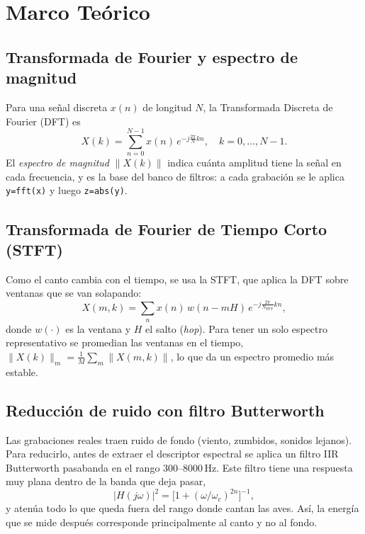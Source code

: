 \documentclass[conference]{IEEEtran}
\begin{document}
\section{Marco Teórico}\label{sec:marco}

\subsection{Transformada de Fourier y espectro de magnitud}
Para una señal discreta $x(n)$ de longitud $N$, la Transformada Discreta de
Fourier (DFT) es
\begin{equation}
X(k)=\sum_{n=0}^{N-1} x(n)\,e^{-j\frac{2\pi}{N}kn}, \quad k=0,\dots,N-1 .
\end{equation}
El \emph{espectro de magnitud} $\lVert X(k)\rVert$ indica cuánta amplitud tiene la
señal en cada frecuencia, y es la base del banco de filtros: a cada grabación se
le aplica \texttt{y=fft(x)} y luego \texttt{z=abs(y)}.

\subsection{Transformada de Fourier de Tiempo Corto (STFT)}
Como el canto cambia con el tiempo, se usa la STFT, que aplica la DFT sobre
ventanas que se van solapando:
\begin{equation}
X(m,k)=\sum_{n} x(n)\,w(n-mH)\,e^{-j\frac{2\pi}{N_{\text{FFT}}}kn},
\end{equation}
donde $w(\cdot)$ es la ventana y $H$ el salto (\emph{hop}). Para tener un solo
espectro representativo se promedian las ventanas en el tiempo,
$\lVert X(k)\rVert_m=\frac{1}{M}\sum_{m}\lVert X(m,k)\rVert$, lo que da un espectro
promedio más estable.

\subsection{Reducción de ruido con filtro Butterworth}
Las grabaciones reales traen ruido de fondo (viento, zumbidos, sonidos lejanos).
Para reducirlo, antes de extraer el descriptor espectral se aplica un filtro IIR
Butterworth pasabanda en el rango $300$--$8000$\,Hz. Este filtro tiene una
respuesta muy plana dentro de la banda que deja pasar,
\begin{equation}\label{eq:butter}
\lvert H(j\omega)\rvert^2=\big[1+(\omega/\omega_c)^{2n}\big]^{-1},
\end{equation}
y atenúa todo lo que queda fuera del rango donde cantan las aves. Así, la energía
que se mide después corresponde principalmente al canto y no al fondo.
\end{document}
